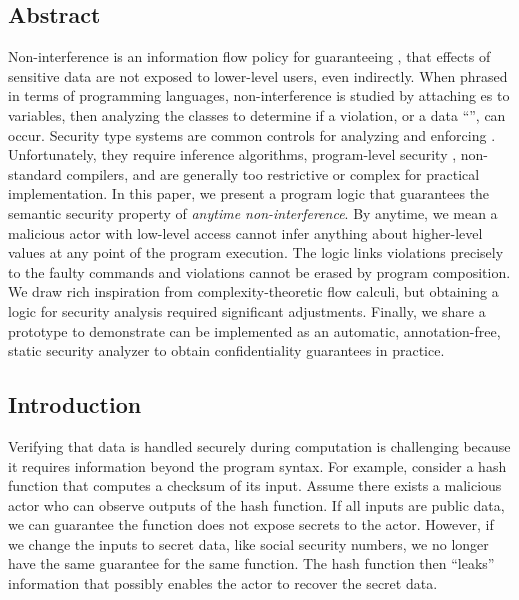 \subsection*{Abstract}
\label{subsec:ni-abs}

Non-interference is an information flow
policy for guaranteeing ,
\ie that effects of sensitive data are not exposed to lower-level users, even
indirectly. When phrased in terms of programming languages, non-interference is
studied by attaching es to variables, then analyzing the
classes to determine if a violation, or a data \enquote{}, can occur.
Security type systems are common controls for
analyzing and enforcing . Unfortunately, they require
inference algorithms, program-level security , non-standard
compilers, and are generally too restrictive or complex for practical
implementation. In this paper, we present a program logic \lname that guarantees
the semantic security property of \emph{anytime
non-interference}. By anytime, we mean a
malicious actor with low-level access cannot infer anything about higher-level
values at any point of the program execution. The logic links
 violations precisely to the faulty commands and
violations cannot be erased by program composition. We draw rich inspiration
from complexity-theoretic flow calculi, but obtaining a logic for security
analysis required significant adjustments. Finally, we share a prototype to
demonstrate \lname can be implemented as an automatic, annotation-free, static
security analyzer to obtain confidentiality guarantees in practice.

\subsection{Introduction}
\label{subsec:ni-introduction}

Verifying that data is handled securely during computation is challenging
because it requires information beyond the program syntax. For example, consider
a hash function that computes a checksum of its input. Assume there exists a
malicious actor who can observe outputs of the hash function. If all inputs are
public data, we can guarantee the function does not expose secrets to the actor.
However, if we change the inputs to secret data, like social security numbers,
we no longer have the same guarantee for the same function. The hash function
then \enquote{leaks} information that possibly enables the actor to recover the
secret data.

